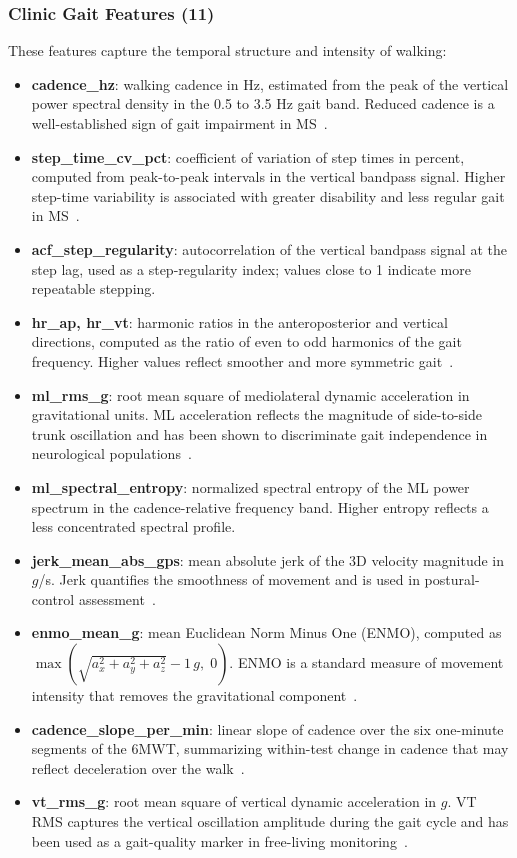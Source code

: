 \documentclass{article}
\begin{document}
\subsubsection{Clinic Gait Features (11)}
These features capture the temporal structure and intensity of walking:
\begin{itemize}
    \item \textbf{cadence\_hz}: walking cadence in Hz, estimated from the peak of the vertical power spectral density in the 0.5 to 3.5 Hz gait band. Reduced cadence is a well-established sign of gait impairment in MS~\cite{sosnoff2012quantifying}.
    \item \textbf{step\_time\_cv\_pct}: coefficient of variation of step times in percent, computed from peak-to-peak intervals in the vertical bandpass signal. Higher step-time variability is associated with greater disability and less regular gait in MS~\cite{kalron2015association}.
    \item \textbf{acf\_step\_regularity}: autocorrelation of the vertical bandpass signal at the step lag, used as a step-regularity index; values close to 1 indicate more repeatable stepping.
    \item \textbf{hr\_ap, hr\_vt}: harmonic ratios in the anteroposterior and vertical directions, computed as the ratio of even to odd harmonics of the gait frequency. Higher values reflect smoother and more symmetric gait~\cite{igarashi2024accelerometer}.
    \item \textbf{ml\_rms\_g}: root mean square of mediolateral dynamic acceleration in gravitational units. ML acceleration reflects the magnitude of side-to-side trunk oscillation and has been shown to discriminate gait independence in neurological populations~\cite{igarashi2024accelerometer}.
    \item \textbf{ml\_spectral\_entropy}: normalized spectral entropy of the ML power spectrum in the cadence-relative frequency band. Higher entropy reflects a less concentrated spectral profile.
    \item \textbf{jerk\_mean\_abs\_gps}: mean absolute jerk of the 3D velocity magnitude in $g$/s. Jerk quantifies the smoothness of movement and is used in postural-control assessment~\cite{mancini2012isway}.
    \item \textbf{enmo\_mean\_g}: mean Euclidean Norm Minus One (ENMO), computed as $\max(\sqrt{a_x^2 + a_y^2 + a_z^2} - 1\,g,\; 0)$. ENMO is a standard measure of movement intensity that removes the gravitational component~\cite{vanhees2013separating}.
    \item \textbf{cadence\_slope\_per\_min}: linear slope of cadence over the six one-minute segments of the 6MWT, summarizing within-test change in cadence that may reflect deceleration over the walk~\cite{qureshi2016relationship}.
    \item \textbf{vt\_rms\_g}: root mean square of vertical dynamic acceleration in $g$. VT RMS captures the vertical oscillation amplitude during the gait cycle and has been used as a gait-quality marker in free-living monitoring~\cite{storm2020free, igarashi2024accelerometer}.
\end{itemize}
\end{document}
